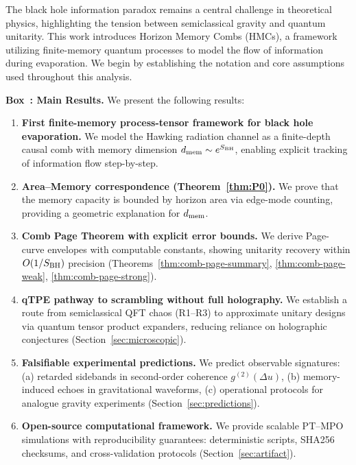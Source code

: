 \documentclass[11pt,a4paper]{article}
\newcounter{boxedresult}
\newenvironment{boxedresult}[1]{\refstepcounter{boxedresult}\begin{infobox}\noindent\textbf{Box~\theboxedresult: #1.}}{\end{infobox}}
\theoremstyle{plain}
\theoremstyle{definition}
\theoremstyle{remark}
\begin{document}
The black hole information paradox remains a central challenge in theoretical physics, highlighting the tension between semiclassical gravity and quantum unitarity. This work introduces Horizon Memory Combs (HMCs), a framework utilizing finite-memory quantum processes to model the flow of information during evaporation. We begin by establishing the notation and core assumptions used throughout this analysis.

\begin{boxedresult}{Main Results}
\small
We present the following results:
\begin{enumerate}[leftmargin=1.5em,itemsep=0.2em,topsep=0.3em]
\item \textbf{First finite-memory process-tensor framework for black hole evaporation.} We model the Hawking radiation channel as a finite-depth causal comb with memory dimension $d_{\rm mem} \sim e^{S_{\rm BH}}$, enabling explicit tracking of information flow step-by-step.
\item \textbf{Area--Memory correspondence (Theorem~\ref{thm:P0}).} We prove that the memory capacity is bounded by horizon area via edge-mode counting, providing a geometric explanation for $d_{\rm mem}$.
\item \textbf{Comb Page Theorem with explicit error bounds.} We derive Page-curve envelopes with computable constants, showing unitarity recovery within $O(1/S_{\rm BH})$ precision (Theorems~\ref{thm:comb-page-summary}, \ref{thm:comb-page-weak}, \ref{thm:comb-page-strong}).
\item \textbf{qTPE pathway to scrambling without full holography.} We establish a route from semiclassical QFT chaos (R1--R3) to approximate unitary designs via quantum tensor product expanders, reducing reliance on holographic conjectures (Section~\ref{sec:microscopic}).
\item \textbf{Falsifiable experimental predictions.} We predict observable signatures: (a) retarded sidebands in second-order coherence $g^{(2)}(\Delta u)$, (b) memory-induced echoes in gravitational waveforms, (c) operational protocols for analogue gravity experiments (Section~\ref{sec:predictions}).
\item \textbf{Open-source computational framework.} We provide scalable PT--MPO simulations with reproducibility guarantees: deterministic scripts, SHA256 checksums, and cross-validation protocols (Section~\ref{sec:artifact}).
\end{enumerate}
\end{boxedresult}
\end{document}
